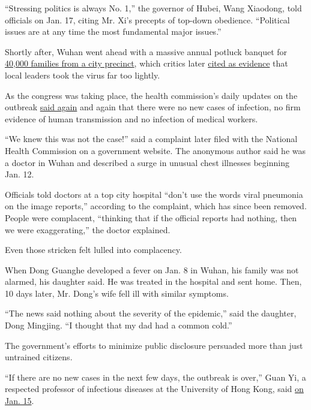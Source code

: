 ``Stressing politics is always No. 1,'' the governor of Hubei, Wang
Xiaodong, told officials on Jan. 17, citing Mr. Xi's precepts of
top-down obedience. ``Political issues are at any time the most
fundamental major issues.''

Shortly after, Wuhan went ahead with a massive annual potluck banquet
for
\href{https://news.sina.com.cn/s/2020-01-21/doc-iihnzhha3843904.shtml}{40,000
families from a city precinct}, which critics later
\href{https://www.dwnews.com/\%E4\%B8\%AD\%E5\%9B\%BD/60165812/\%E6\%AD\%A6\%E6\%B1\%89\%E8\%82\%BA\%E7\%82\%8E\%E7\%96\%AB\%E6\%83\%85\%E6\%AD\%A6\%E6\%B1\%89\%E7\%A4\%BE\%E5\%8C\%BA\%E8\%BF\%98\%E5\%9C\%A8\%E4\%B8\%BE\%E5\%8A\%9E\%E4\%B8\%87\%E5\%AE\%B6\%E5\%AE\%B4\%E5\%B8\%82\%E9\%95\%BF\%E5\%9B\%9E\%E5\%BA\%94}{cited
as evidence} that local leaders took the virus far too lightly.

As the congress was taking place, the health commission's daily updates
on the outbreak
\href{http://wjw.wuhan.gov.cn/front/web/showDetail/2020011109036}{said
again} and again that there were no new cases of infection, no firm
evidence of human transmission and no infection of medical workers.

``We knew this was not the case!'' said a complaint later filed with the
National Health Commission on a government website. The anonymous author
said he was a doctor in Wuhan and described a surge in unusual chest
illnesses beginning Jan. 12.

Officials told doctors at a top city hospital ``don't use the words
viral pneumonia on the image reports,'' according to the complaint,
which has since been removed. People were complacent, ``thinking that if
the official reports had nothing, then we were exaggerating,'' the
doctor explained.

Even those stricken felt lulled into complacency.

When Dong Guanghe developed a fever on Jan. 8 in Wuhan, his family was
not alarmed, his daughter said. He was treated in the hospital and sent
home. Then, 10 days later, Mr. Dong's wife fell ill with similar
symptoms.

``The news said nothing about the severity of the epidemic,'' said the
daughter, Dong Mingjing. ``I thought that my dad had a common cold.''

The government's efforts to minimize public disclosure persuaded more
than just untrained citizens.

``If there are no new cases in the next few days, the outbreak is
over,'' Guan Yi, a respected professor of infectious diseases at the
University of Hong Kong, said
\href{https://www.nytimes3xbfgragh.onion/2020/01/15/world/asia/coronavirus-japan-china.html}{on
Jan. 15}.

